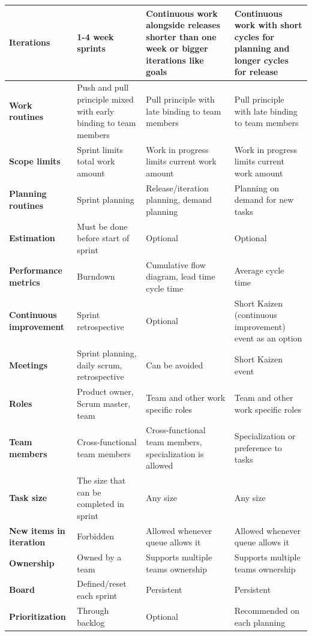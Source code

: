 \begin{center}
\begin{longtable}{| p{2.25cm} | p{2.8cm} | p{2.8cm} | p{2.8cm} |}
    \textbf{Iterations} & 1-4 week sprints & Continuous work alongside releases shorter than one week or bigger iterations like goals & Continuous work with short cycles for planning and longer cycles for release \\ \hline
    \textbf{Work routines} & Push and pull principle mixed with early binding to team members & Pull principle with late binding to team members & Pull principle with late binding to team members \\ \hline
    \textbf{Scope limits} & Sprint limits total work amount & Work in progress limits current work amount & Work in progress limits current work amount \\ \hline
    \textbf{Planning routines} & Sprint planning & Release/iteration planning, demand planning & Planning on demand for new tasks \\ \hline
    \textbf{Estimation} & Must be done before start of sprint & Optional & Optional \\ \hline
    \textbf{Performance metrics} & Burndown & Cumulative flow diagram, lead time cycle time & Average cycle time \\ \hline
    \textbf{Continuous improvement} & Sprint retrospective & Optional & Short Kaizen (continuous improvement) event as an option \\ \hline
    \textbf{Meetings} & Sprint planning, daily scrum, retrospective & Can be avoided & Short Kaizen event \\ \hline
    \textbf{Roles} & Product owner, Scrum master, team & Team and other work specific roles & Team and other work specific roles \\ \hline
    \textbf{Team members} & Cross-functional team members & Cross-functional team members, specialization is allowed & Specialization or preference to tasks \\ \hline
    \textbf{Task size} & The size that can be completed in sprint & Any size & Any size \\ \hline
    \textbf{New items in iteration} & Forbidden & Allowed whenever queue allows it & Allowed whenever queue allows it \\ \hline
    \textbf{Ownership} & Owned by a team & Supports multiple teams ownership & Supports multiple teams ownership \\ \hline
    \textbf{Board} & Defined/reset each sprint & Persistent & Persistent \\ \hline
    \textbf{Prioritization} & Through backlog & Optional & Recommended on each planning \\ \hline

\end{longtable}
\end{center}
